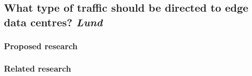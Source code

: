\subsection{What type of traffic should be directed to edge data centres? \emph{Lund}}
\subsubsection{Proposed research}
\subsubsection{Related research}